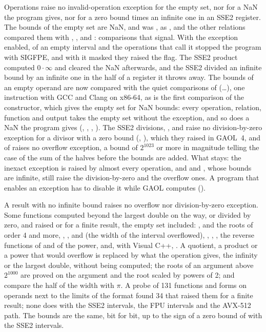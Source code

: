 Operations raise no invalid-operation exception for the empty set, nor for a
NaN the program gives, nor for a zero bound times an infinite one in an SSE2
register.\newinvfive{} The bounds of the empty set are NaN, and
 was , as ,
 and the other relations compared them with \code{<},
\code{<=}, \code{>} and \code{>=}: comparisons that signal. With the
exception enabled,  of an empty interval and the operations
that call it stopped the program with SIGFPE, and with it masked they raised
the flag. The SSE2 product computed $0 \cdot \infty$ and cleared the NaN
afterwards, and the SSE2  divided an infinite bound by an
infinite one in the half of a register it throws away. The bounds of an empty
operand are now compared with the quiet comparisons of 
(\ldots), one instruction with GCC and Clang on
x86-64, as is the first comparison of the constructor, which gives the empty
set for NaN bounds: every operation, relation, function and output takes the
empty set without the exception, and so does a NaN the program gives
(, , , ).
The SSE2 divisions, \code{\%},  and  raise
no division-by-zero exception for a divisor with a zero bound
(, ), which they raised in GAOL~4, and
 of  raises no overflow exception, a bound
of $2^{1023}$ or more in magnitude telling the case of the sum of the halves
before the bounds are added. What stays: the inexact exception is raised by
almost every operation, and  and , whose
bounds are infinite, still raise the division-by-zero and the overflow ones.
A program that enables an exception has to disable it while GAOL computes
().

\medskip
A result with no infinite bound raises no overflow nor division-by-zero
exception.\newinvfive{} Some functions computed beyond the largest double on
the way, or divided by zero, and raised  or
 for a finite result, the empty set included:
,  and the roots of
order 4 and more, , ,
 and  (the width of the interval
overflowed), , , ,
the reverse functions of  and of the power, 
and, with Visual C++, . A quotient, a product or a
power that would overflow is replaced by what the operation gives, the
infinity or the largest double, without being computed; the roots of an
argument above $2^{1000}$ are proved on the argument and the root scaled by
powers of 2;  and  compare the half of the width
with $\pi$. A probe of 131 functions and forms on operands next to the limits
of the format found 34 that raised them for a finite result; none does with
the SSE2 intervals, the FPU intervals and the AVX-512 path. The bounds are the
same, bit for bit, up to the sign of a zero bound of  with
the SSE2 intervals.

